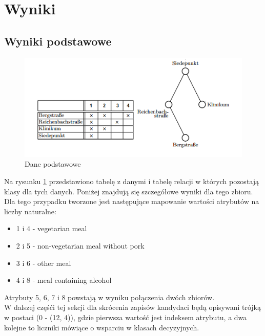 \documentclass[a4paper,12pt]{article}
\begin{document}
\section{Wyniki}

\subsection{Wyniki podstawowe}

\begin{figure}[h!]
\begin{center}
\includegraphics[width=\textwidth]{img/dane.png}
\caption{Dane podstawowe}
\label{dane_podstawowe}
\end{center}
\end{figure}

Na rysunku \ref{dane_podstawowe} przedstawiono tabelę z danymi i tabelę relacji w których pozostają klasy dla tych danych. Poniżej znajdują się szczegółowe wyniki dla tego zbioru.\\

Dla tego przypadku tworzone jest następujące mapowanie wartości atrybutów na liczby naturalne:\\

\begin{itemize}
\item 1 i 4 - vegetarian meal
\item 2 i 5 - non-vegetarian meal without pork
\item 3 i 6 - other meal
\item 4 i 8 - meal containing alcohol
\end{itemize}

Atrybuty 5, 6, 7 i 8 powstają w wyniku połączenia dwóch zbiorów.\\

W dalszej częśći tej sekcji dla skrócenia zapisów kandydaci będą opisywani trójką w postaci (0 - (12, 4)), gdzie pierwsza wartość jest indeksem atrybutu, a dwa kolejne to liczniki mówiące o wsparciu w klasach decyzyjnych.
\end{document}
